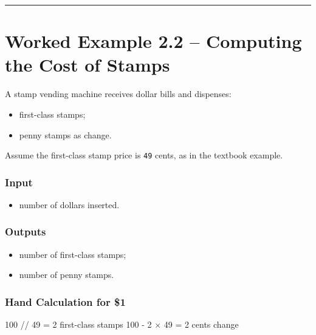 \documentclass[
]{article}
\newenvironment{Shaded}{\begin{snugshade}}{\end{snugshade}}
\newcommand{\NormalTok}[1]{#1}
\providecommand{\tightlist}{%
  \setlength{\itemsep}{0pt}\setlength{\parskip}{0pt}}
\begin{document}
\begin{center}\rule{0.5\linewidth}{0.5pt}\end{center}

\section{Worked Example 2.2 -- Computing the Cost of
Stamps}\label{worked-example-2.2-computing-the-cost-of-stamps}

A stamp vending machine receives dollar bills and dispenses:

\begin{itemize}
\tightlist
\item
  first-class stamps;
\item
  penny stamps as change.
\end{itemize}

Assume the first-class stamp price is \texttt{49} cents, as in the
textbook example.

\subsubsection{Input}\label{input}

\begin{itemize}
\tightlist
\item
  number of dollars inserted.
\end{itemize}

\subsubsection{Outputs}\label{outputs-1}

\begin{itemize}
\tightlist
\item
  number of first-class stamps;
\item
  number of penny stamps.
\end{itemize}

\subsubsection{Hand Calculation for \$1}\label{hand-calculation-for-1}

\begin{Shaded}
\begin{Highlighting}[]
\NormalTok{100 // 49 = 2 first{-}class stamps}
\NormalTok{100 {-} 2 × 49 = 2 cents change}
\end{Highlighting}
\end{Shaded}
\end{document}
